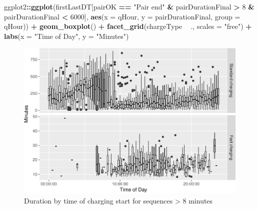 \documentclass[]{article}
\newenvironment{Shaded}{\begin{snugshade}}{\end{snugshade}}
\newcommand{\KeywordTok}[1]{\textcolor[rgb]{0.13,0.29,0.53}{\textbf{#1}}}
\newcommand{\DataTypeTok}[1]{\textcolor[rgb]{0.13,0.29,0.53}{#1}}
\newcommand{\DecValTok}[1]{\textcolor[rgb]{0.00,0.00,0.81}{#1}}
\newcommand{\StringTok}[1]{\textcolor[rgb]{0.31,0.60,0.02}{#1}}
\newcommand{\OperatorTok}[1]{\textcolor[rgb]{0.81,0.36,0.00}{\textbf{#1}}}
\newcommand{\NormalTok}[1]{#1}
\begin{document}
\begin{Shaded}
\begin{Highlighting}[]
\NormalTok{ggplot2}\OperatorTok{::}\KeywordTok{ggplot}\NormalTok{(firstLastDT[pairOK }\OperatorTok{==}\StringTok{ "Pair end"} \OperatorTok{&}\StringTok{ }\NormalTok{pairDurationFinal }\OperatorTok{>}\StringTok{ }\DecValTok{8} \OperatorTok{&}\StringTok{ }\NormalTok{pairDurationFinal }\OperatorTok{<}\StringTok{ }\DecValTok{6000}\NormalTok{], }
                \KeywordTok{aes}\NormalTok{(}\DataTypeTok{x =}\NormalTok{ qHour, }\DataTypeTok{y =}\NormalTok{ pairDurationFinal, }\DataTypeTok{group =}\NormalTok{ qHour)) }\OperatorTok{+}
\StringTok{  }\KeywordTok{geom_boxplot}\NormalTok{() }\OperatorTok{+}
\StringTok{  }\KeywordTok{facet_grid}\NormalTok{(chargeType }\OperatorTok{~}\StringTok{ }\NormalTok{., }\DataTypeTok{scales =} \StringTok{"free"}\NormalTok{) }\OperatorTok{+}
\StringTok{  }\KeywordTok{labs}\NormalTok{(}\DataTypeTok{x =} \StringTok{"Time of Day"}\NormalTok{,}
       \DataTypeTok{y =} \StringTok{"Minutes"}\NormalTok{)}
\end{Highlighting}
\end{Shaded}

\begin{figure}
\centering
\includegraphics{EVBB_SummaryReport_files/figure-latex/durationTimeBox-1.pdf}
\caption{\label{fig:durationTimeBox}Duration by time of charging start for
sequences \textgreater{} 8 minutes}
\end{figure}
\end{document}
